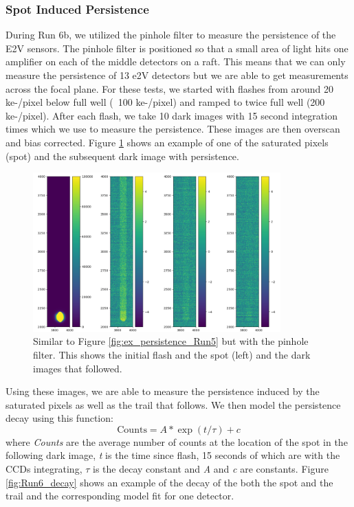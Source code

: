 \documentclass[DM,authoryear,toc]{lsstdoc}
\begin{document}
\subsubsection{Spot Induced Persistence}
During Run 6b, we utilized the pinhole filter to measure the persistence of the E2V sensors.
The pinhole filter is positioned so that a small area of light hits one amplifier on each of the middle detectors on a raft.
This means that we can only measure the persistence of 13 e2V detectors but we are able to get measurements across the focal plane.
For these tests, we started with flashes from around 20 ke-/pixel below full well (~100 ke-/pixel) and ramped to twice full well (200 ke-/pixel).
After each flash, we take 10 dark images with 15 second integration times which we use to measure the persistence.
These images are then overscan and bias corrected.
Figure \ref{fig:Run6_example} shows an example of one of the saturated pixels (spot) and the subsequent dark image with persistence.

\begin{figure}[!htp]
  \centering
  \includegraphics[width=0.85\textwidth, angle=0]{Run6_ex.png}
  \caption{
  Similar to Figure \ref{fig:ex_persistence_Run5} but with the pinhole filter. 
  This shows the initial flash and the spot (left) and the dark images that followed.
  }\label{fig:Run6_example}
\end{figure}


Using these images, we are able to measure the persistence induced by the saturated pixels as well as the trail that follows.
We then model the persistence decay using this function:
\begin{equation*}
  \textrm{Counts}= A * \exp(t/\tau)+c
\end{equation*}
where \textit{Counts} are the average number of counts at the location of the spot in the following dark image, \textit{t} is the time since flash, 15 seconds of which are with the CCDs integrating, \textit{$\tau$} is the decay constant and \textit{A} and \textit{c} are constants.
Figure \ref{fig:Run6_decay} shows an example of the decay of the both the spot and the trail and the corresponding model fit for one detector.
\end{document}
